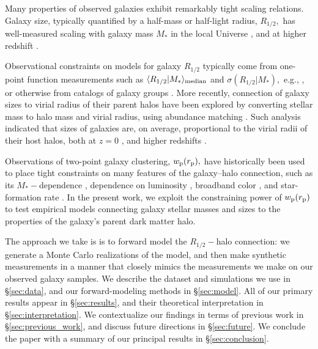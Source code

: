 \documentclass[usenatbib,usegraphicx,letterpaper]{mn2e}
\newcommand{\rhalf}{R_{1/2}}
\newcommand{\mstar}{M_{\ast}}
\newcommand{\rproj}{r_{\rm p}}
\newcommand{\wproj}{w_{\rm p}}
\newcommand{\median}[2]{\langle{#1}\vert{#2}\rangle_{\rm median}}
\begin{document}
Many properties of observed galaxies exhibit remarkably tight scaling relations. Galaxy size, typically quantified by a half-mass or half-light radius, $\rhalf,$ has well-measured scaling with galaxy mass $\mstar$ in the local Universe \citep{shen_etal03,guo_etal09,huang_etal13,lange_etal15,zhang_yang17}, and at higher redshift \citep{trujillo_etal04,vanderwel_etal14,kawamata_etal15,shibuya_etal15,huertas_company_etal13a,huang_etal17}. 

Observational constraints on models for galaxy $\rhalf$ typically come from one-point function measurements such as $\median{\rhalf}{\mstar}$ and $\sigma(\rhalf\vert\mstar),$ e.g.,  \citet{khochfar_silk06,desmond_etal17,bottrell_etal17b,hou_etal17,somerville_etal17}, or otherwise from catalogs of galaxy groups \citep{weinmann_etal08,huertas_company_etal13b,spindler_wake17}. More recently, connection of galaxy sizes to virial radius of their parent halos have been 
explored by converting stellar mass to halo mass and virial radius, using abundance matching \citep{kravtsov_etal04,tasitsiomi_etal04,vale_ostriker04,vale_ostriker06,conroy_etal06}.  Such analysis indicated that sizes of galaxies
are, on average, proportional to the virial radii of their host halos, both at $z=0$ \citep{kravtsov13}, and higher redshifts \citep{huang_etal17,somerville_etal17}. 

Observations of two-point galaxy clustering, $\wproj(\rproj),$ have historically been used to place tight constraints on many features of the galaxy--halo connection, such as its $\mstar-$dependence \citep{moster_etal10,leauthaud_etal11,reddick_etal13,skibba_etal15}, dependence on luminosity \citep{kravtsov_etal04, tasitsiomi_etal04,vale_ostriker04,vale_ostriker06,tinker_etal05,cacciato_etal13}, broadband color \citep{coil_etal08,zehavi_etal11,guo_etal11,hearin_watson13}, and star-formation rate \citep{wang_etal07,tinker_etal13,watson_etal14}. In the present work, we exploit the constraining power of $\wproj(\rproj)$ to test empirical models connecting galaxy stellar masses and sizes to the properties of the galaxy's parent dark matter halo.

The approach we take is is to forward model the $\rhalf-$halo connection: we generate a Monte Carlo realizations of the model, and then make synthetic measurements in a manner that closely mimics the measurements we make on our observed galaxy samples. We describe the dataset and simulations we use in \S\ref{sec:data}, and our forward-modeling methods in \S\ref{sec:model}. All of our primary results appear in \S\ref{sec:results}, and their theoretical interpretation in \S\ref{sec:interpretation}. We contextualize our findings in terms of previous work in \S\ref{sec:previous_work}, and discuss future directions in \S\ref{sec:future}. We conclude the paper with a summary of our principal results in \S\ref{sec:conclusion}. 
\end{document}
